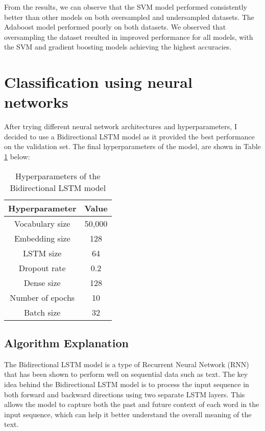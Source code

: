 \documentclass[12pt, a4paper]{article}
\begin{document}
\newline
From the results, we can observe that the SVM model performed consistently better than other models on both oversampled and undersampled datasets. The Adaboost model performed poorly on both datasets. We observed that oversampling the dataset resulted in improved performance for all models, with the SVM and gradient boosting models achieving the highest accuracies.






\section{Classification using neural networks}
After trying different neural network architectures and hyperparameters, I decided to use a Bidirectional LSTM model as it provided the best performance on the validation set. The final hyperparameters of the model, are shown in Table \ref{tab:bilstm_hyperparameters} below:
\newline

\begin{table}[htp]
\centering
\label{tab:bilstm_hyperparameters}
\begin{tabular}{c c} 
 \hline
 Hyperparameter & Value \\ [0.5ex] 
 \hline\hline
Vocabulary size & 50,000 \\
Embedding size & 128 \\
LSTM size & 64 \\
Dropout rate & 0.2 \\
Dense size & 128 \\
Number of epochs & 10 \\
Batch size & 32 \\
 \hline
\end{tabular}
\caption{Hyperparameters of the Bidirectional LSTM model}
\end{table}

\subsection{Algorithm Explanation}
The Bidirectional LSTM model is a type of Recurrent Neural Network (RNN) that has been shown to perform well on sequential data such as text. The key idea behind the Bidirectional LSTM model is to process the input sequence in both forward and backward directions using two separate LSTM layers. This allows the model to capture both the past and future context of each word in the input sequence, which can help it better understand the overall meaning of the text.
\end{document}
